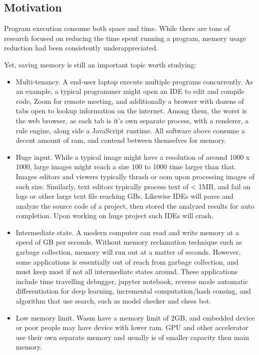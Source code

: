 \subsection{Motivation}
Program execution consume both space and time. While there are tons of research focused on reducing the time spent running a program, memory usage reduction had been consistently underappreciated.

Yet, saving memory is still an important topic worth studying:
\begin{itemize}
	\item Multi-tenancy. A end-user laptop execute multiple programs concurrently. As an example, a typical programmer might open an IDE to edit and compile code, Zoom for remote meeting, and additionally a browser with dozens of tabs open to lookup information on the internet. Among them, the worst is the web browser, as each tab is it's own separate process, with a renderer, a rule engine, along side a JavaScript runtime. All software above consume a decent amount of ram, and contend between themselves for memory.
	\item Huge input. While a typical image might have a resolution of around 1000 x 1000, large images might reach a size 100 to 1000 time larger than that. Images editors and viewers typically thrash or oom upon processing images of such size. Similarly, text editors typically process text of < 1MB, and fail on logs or other large text file reaching GBs. Likewise IDEs will parse and analyze the source code of a project, then stored the analyzed results for auto completion. Upon working on huge project such IDEs will crash.
	\item Intermediate state. A modern computer can read and write memory at a speed of GB per seconds. Without memory reclamation technique such as garbage collection, memory will run out at a matter of seconds. However, some applications is essentially out of reach from garbage collection, and must keep most if not all intermediate states around. These applications include time travelling debugger, jupyter notebook, reverse mode automatic differentiation for deep learning, incremental computation/hash consing, and algorithm that use search, such as model checker and chess bot.
	\item Low memory limit. Wasm have a memory limit of 2GB, and embedded device or poor people may have device with lower ram. GPU and other accelerator use their own separate memory and usually is of smaller capacity then main memory.
\end{itemize}

